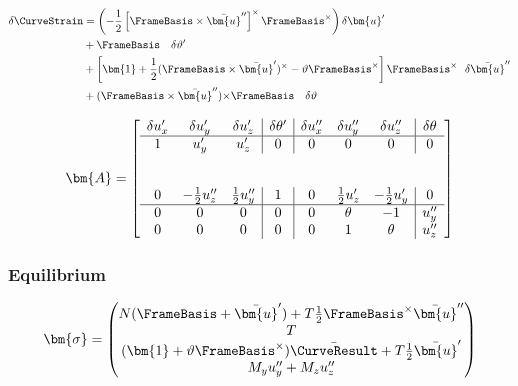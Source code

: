 $$
\begin{aligned}
\delta\CurveStrain &= 
\left(-\frac{1}{2}\left[\FrameBasis\times\bar{\bm{u}}^{\prime\prime}\right]^{\times}\FrameBasis^{\times}\right)  \delta \bm{u}^{\prime} \\
&+ \FrameBasis ~~~ \delta \vartheta^{\prime} \\
&+\left[\bm{1} + \frac{1}{2}(\FrameBasis\times\bar{\bm{u}}^{\prime})^\times - \vartheta\FrameBasis^{\times}\right]\FrameBasis^{\times} ~~ \delta \bar{\bm{u}}^{\prime\prime} \\
&+(\FrameBasis\times\bar{\bm{u}}^{\prime\prime}) {\times} \FrameBasis ~~~ \delta \vartheta
\end{aligned}
$$


$$
\bm{A} = 
\left[
\begin{array}{ccc|c|ccc|c}
\delta u_x^{\prime} &             \delta u_{\FrameYi}^{\prime} &            \delta u_{\FrameZi}^{\prime} & \delta \theta^{\prime} & \delta u_x^{\prime\prime} & \delta u_{\FrameYi}^{\prime\prime} & \delta u_{\FrameZi}^{\prime\prime} & \delta \theta \\ 
\hline
        1 &                    u_{\FrameYi}^{\prime} &                   u_{\FrameZi}^{\prime} & 0 &             0 &                        0 &                         0 &                   0 \\
\\
\\
        0 & -\frac{1}{2} u_{\FrameZi}^{\prime\prime} & \frac{1}{2} u_{\FrameYi}^{\prime\prime} & 1 &             0 & \frac{1}{2} u_{\FrameZi}^{\prime} & -\frac{1}{2} u_{\FrameYi}^{\prime} &                   0 \\ \hline
        0 &                               0 &                              0 & 0 &             0 &                   \theta &       -1 &  u_{\FrameYi}^{\prime\prime} \\
        0 &                               0 &                              0 & 0 &             0 &        1  &                    \theta &  u_{\FrameZi}^{\prime\prime} \\
\end{array}
\right]
$$

\subsubsection{Equilibrium}

\begin{equation*}
\bm{\sigma} = 
\begin{pmatrix}
N (\FrameBasis + \bar{\bm{u}}') + T\frac{1}{2}\FrameBasis^\times \bar{\bm{u}}'' \\
T \\ 
(\bm{1}+\vartheta\FrameBasis^{\times}) \bar{\CurveResult} + T \frac{1}{2} \bar{\bm{u}}' \\
M_{\FrameYi} u_{\FrameYi}^{\prime\prime} + M_{\FrameZi} u_{\FrameZi}^{\prime\prime}
\end{pmatrix} 
\end{equation*}

